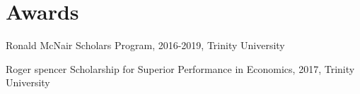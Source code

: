 
\section{Awards} %
\label{sec:award}
\vspace{-0.25in}
\begin{outerlist}
	\item 	 Ronald McNair Scholars Program, 2016-2019, Trinity  University
	\item    Roger spencer Scholarship for Superior Performance in Economics, 2017, Trinity University 
\end{outerlist}